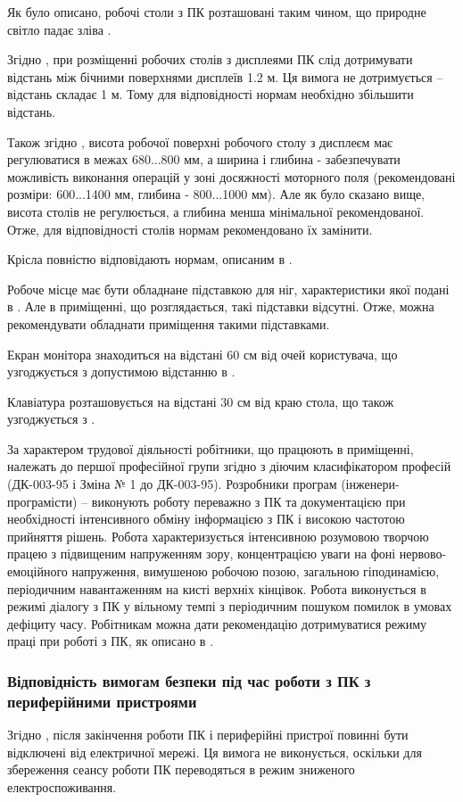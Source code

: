 \documentclass[a4paper,12pt]{article}
\begin{document}
Як було описано, робочі столи з ПК розташовані таким чином, що природне світло падає зліва \cite{sanpin798}.

Згідно \cite{sanpin798}, при розміщенні робочих столів з дисплеями ПК слід дотримувати відстань між бічними поверхнями дисплеїв 1.2 м. Ця вимога не дотримується -- відстань складає 1 м. Тому для відповідності нормам необхідно збільшити відстань.

Також згідно \cite{sanpin798}, висота робочої поверхні робочого столу з дисплеєм має регулюватися в межах 680...800 мм, а ширина і глибина - забезпечувати можливість виконання операцій у зоні досяжності моторного поля (рекомендовані розміри: 600...1400 мм, глибина - 800...1000 мм). Але як було сказано вище, висота столів не регулюється, а глибина менша мінімальної рекомендованої. Отже, для відповідності столів нормам рекомендовано їх замінити.

Крісла повністю відповідають нормам, описаним в \cite{sanpin798}.

Робоче місце має бути обладнане підставкою для ніг, характеристики якої подані в \cite{sanpin798}. Але в приміщенні, що розглядається, такі підставки відсутні. Отже, можна рекомендувати обладнати приміщення такими підставками.

Екран монітора знаходиться на відстані 60 см від очей користувача, що узгоджується з допустимою відстанню в \cite{sanpin798}.

Клавіатура розташовується на відстані 30 см від краю стола, що також узгоджується з \cite{sanpin798}.

За характером трудової діяльності робітники, що працюють в приміщенні, належать до першої професійної групи згідно з діючим класифікатором професій (ДК-003-95 і Зміна № 1 до ДК-003-95). Розробники програм (інженери-програмісти) -- виконують роботу переважно з ПК та документацією при необхідності інтенсивного обміну інформацією з ПК і високою частотою прийняття рішень. Робота характеризується інтенсивною розумовою творчою працею з підвищеним напруженням зору, концентрацією уваги на фоні нервово-емоційного напруження, вимушеною робочою позою, загальною гіподинамією, періодичним навантаженням на кисті верхніх кінцівок. Робота виконується в режимі діалогу з ПК у вільному темпі з періодичним пошуком помилок в умовах дефіциту часу. Робітникам можна дати рекомендацію дотримуватися режиму праці при роботі з ПК, як описано в \cite{sanpin798}.

\subsubsection{Відповідність вимогам безпеки під час роботи з ПК з периферійними пристроями}
Згідно \cite{npaop1210}, після закінчення роботи ПК і периферійні пристрої повинні бути відключені від електричної мережі. Ця вимога не виконується, оскільки для збереження сеансу роботи ПК переводяться в режим зниженого електроспоживання.
\end{document}
